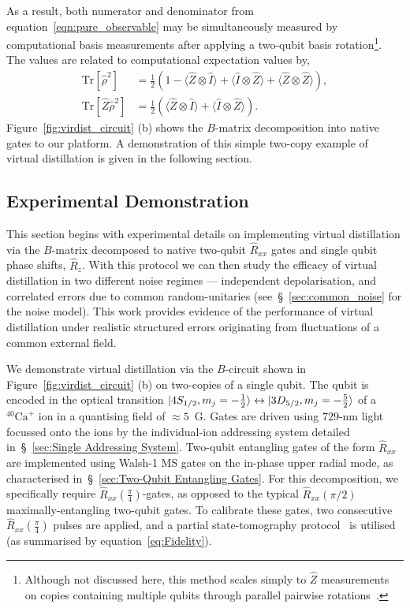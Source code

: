 As a result, both numerator and denominator from equation~\ref{eqn:pure_observable} may be simultaneously measured by computational basis measurements after applying a two-qubit basis rotation\footnote{Although not discussed here, this method scales simply to $\hat Z$ measurements on copies containing multiple qubits through parallel pairwise rotations~\cite{huggins_virtual_2021}.}. 
The values are related to computational expectation values by,
\begin{subequations}
\label{eqn:VD_ZZ}
\begin{align}
    \mathrm{Tr}[\hat\rho^2] &= \frac{1}{2}(1-\langle \hat Z\otimes \hat I\rangle +\langle \hat I\otimes \hat Z\rangle +\langle \hat Z\otimes \hat Z\rangle  ), \\
    \mathrm{Tr}[\hat Z \hat\rho^2] &= \frac{1}{2}(\langle \hat Z\otimes \hat I\rangle + \langle \hat I\otimes \hat Z\rangle).
\end{align}
\end{subequations}
Figure~\ref{fig:virdist_circuit} (b) shows the $B$-matrix decomposition into native gates to our platform. A demonstration of this simple two-copy example of virtual distillation is given in the following section.

\subsection{Experimental Demonstration}
\label{sec:vd_exp}

This section begins with experimental details on implementing virtual
distillation via the $B$-matrix decomposed to native two-qubit $\hat R_{xx}$ gates and single qubit
phase shifts, $\hat R_z$. With this protocol we can then study the efficacy of virtual distillation in two
different noise regimes --- independent depolarisation, and correlated errors due
to common random-unitaries (see~\S~\ref{sec:common_noise} for the noise
model). This work provides evidence of the performance of virtual distillation
under realistic structured errors originating from fluctuations of a common
external field.

We demonstrate virtual distillation via the $B$-circuit shown in Figure~\ref{fig:virdist_circuit} (b) on two-copies of a single qubit. 
The qubit is encoded in the optical transition
$\ket{4S_{1/2},m_j=-\frac{1}{2}}\leftrightarrow\ket{3D_{5/2},m_j=-\frac{5}{2}}$ of a $^{40}\text{Ca}^+$ ion 
in a quantising field of $\approx5$~G. Gates are driven using 729-nm light focussed onto the ions by the
individual-ion addressing system detailed in~\S~\ref{sec:Single Addressing
System}. Two-qubit entangling gates of the form $\hat R_{xx}$ are implemented using
Walsh-1 MS gates on the in-phase upper radial mode, as characterised in~\S~\ref{sec:Two-Qubit Entangling Gates}. For this decomposition, we specifically require $\hat R_{xx}(\frac{\pi}{4})$-gates, as opposed to the typical $\hat R_{xx}(\pi/2)$ maximally-entangling two-qubit gates. To calibrate these gates, two consecutive $\hat R_{xx}(\frac{\pi}{4})$ pulses are applied, and a partial state-tomography protocol~\cite{sackett_experimental_2000} is utilised (as summarised by equation~\ref{eq:Fidelity}).


